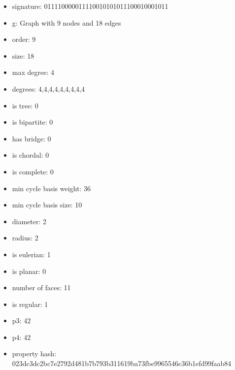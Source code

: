 \newpage
\begin{figure}
\end{figure}
\begin{itemize}
\item signature: 011110000011110010101011100010001011
\item g: Graph with 9 nodes and 18 edges
\item order: 9
\item size: 18
\item max degree: 4
\item degrees: 4,4,4,4,4,4,4,4,4
\item is tree: 0
\item is bipartite: 0
\item has bridge: 0
\item is chordal: 0
\item is complete: 0
\item min cycle basis weight: 36
\item min cycle basis size: 10
\item diameter: 2
\item radius: 2
\item is eulerian: 1
\item is planar: 0
\item number of faces: 11
\item is regular: 1
\item p3: 42
\item p4: 42
\item property hash: 023dc3dc2bc7e2792d481b7b793b311619ba73fbe9965546c36b1efd99faab84
\end{itemize}

